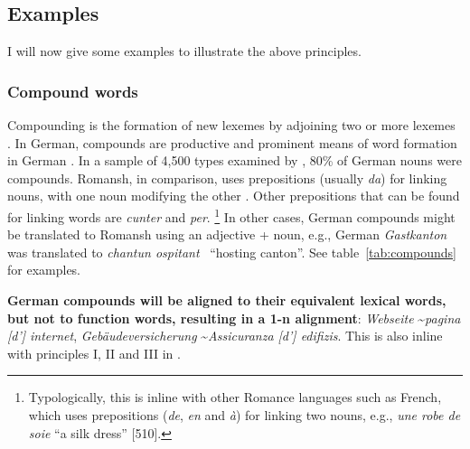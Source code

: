 

\subsection{Examples}
I will now give some examples to illustrate the above principles.
\subsubsection{Compound words}
Compounding is the formation of new lexemes by adjoining two or more lexemes \autocite{bauer1988}. In German, compounds are productive and prominent means of word formation in German \autocite{clematide2018}. 
In a sample of 4,500 types examined by \cite{clematide2018}, 80\% of German nouns were compounds.
Romansh, in comparison, uses prepositions (usually \emph{da}) for linking nouns, with one noun modifying the other \autocite{valladers}. Other prepositions that can be found for linking words are \emph{cunter} and \emph{per}.
\footnote{Typologically, this is inline with other Romance languages such as French, which uses prepositions (\emph{de}, \emph{en} and \emph{à}) for linking two nouns, e.g., \emph{une robe de soie} \enquote{a silk dress} \autocite{price2008}[510].}
In other cases, German compounds might be translated to Romansh using an adjective + noun, e.g., German \emph{Gastkanton} was translated to \emph{chantun ospitant} ~\enquote{hosting canton}.
See table~\ref{tab:compounds} for examples.

\textbf{German compounds will be aligned to their equivalent lexical words, but not to function words, resulting in a 1-n alignment}: \emph{Webseite} \textasciitilde  \emph{pagina [d'] internet}, \emph{Gebäudeversicherung} \textasciitilde \emph{Assicuranza [d'] edifizis}. 
This is also inline with principles I, II and III in \cite{clematide2018}.

